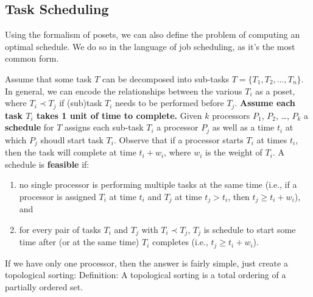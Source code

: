 \documentclass{article}
\begin{document}
    \subsection*{Task Scheduling}
    
    Using the formalism of posets, we can also define the problem of computing an optimal schedule. We do so in the language of job scheduling, as it's the most common form. 

    \vspace{3mm} Assume that some task $T$ can be decomposed into sub-tasks $T = \{T_{1}, T_{2}, \dots, T_{n}\}$. In general, we can encode the relationships between the various $T_{i}$ as a poset, where $T_{i} \prec T_{j}$ if (sub)task $T_{i}$ needs to be performed before $T_{j}$. \textbf{Assume each task $T_{i}$ takes 1 unit of time to complete.} Given $k$ processors $P_{1}$, $P_{2}$, \dots, $P_{k}$ a \textbf{schedule} for $T$ assigns each sub-task $T_{i}$ a processor $P_{j}$ as well as a time $t_{i}$ at which $P_{j}$ shoudl start task $T_{i}$. Observe that if a processor starts $T_{i}$ at times $t_{i}$, then the task will complete at time $t_{i} + w_{i}$, where $w_{i}$ is the weight of $T_{i}$. A schedule is \textbf{feasible} if:

    \begin{enumerate}[label = \arabic*]
        \item no single processor is performing multiple tasks at the same time (i.e., if a processor is assigned $T_{i}$ at time $t_{i}$ and $T_{j}$ at time $t_{j} > t_{i}$, then $t_{j} \ge t_{i} + w_{i}$), and
        \item for every pair of tasks $T_{i}$ and $T_{j}$ with $T_{i} \prec T_{j}$, $T_{j}$ is schedule to start some time after (or at the same time) $T_{i}$ completes (i.e., $t_{j} \ge t_{i} + w_{i}$).
    \end{enumerate}


    

    If we have only one processor, then the answer is fairly simple, just create a topological sorting: Definition: A topological sorting is a total ordering of a partially ordered set.

    
\end{document}
